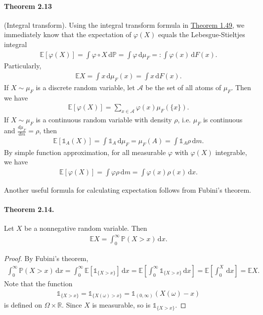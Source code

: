 \documentclass{article}
\numberwithin{equation}{section}
\newcommand{\E}{\mathbb{E}}
\renewcommand{\P}{\mathbb{P}}
\renewcommand{\d}{\mathrm{d}}
\theoremstyle{plain}
\theoremstyle{definition}
\begin{document}
\paragraph{Theorem 2.13\label{thm:2.13}} (Integral transform). Using the integral transform formula in \hyperref[thm:1.49]{Theorem 1.49}, we immediately know that the expectation of $\varphi(X)$ equals the Lebesgue-Stieltjes integral
\begin{align*}
	\E[\varphi(X)] = \int \varphi\circ X\,\d \P = \int \varphi\,\d \mu_F =: \int \varphi(x)\,\d F(x).
\end{align*}
Particularly,
\begin{align*}
	\E X = \int x\,\d \mu_F(x) = \int x\,\d F(x).
\end{align*}
If $X\sim\mu_F$ is a discrete random variable, let $\mathcal{A}$ be the set of all atoms of $\mu_F$. Then we have
\begin{align*}
	\E[\varphi(X)] = \sum_{x\in\mathcal{A}}\varphi(x)\mu_F(\{x\}).
\end{align*}
If $X\sim\mu_F$ is a continuous random variable with density $\rho$, i.e. $\mu_F$ is continuous and $\frac{d\mu_F}{dm}=\rho$, then
\begin{align*}
	\E[\mathds{1}_A(X)] = \int\mathds{1}_A\,\d \mu_F = \mu_F(A) = \int \mathds{1}_A\rho\,\d m.
\end{align*}
By simple function approximation, for all measurable $\varphi$ with $\varphi(X)$ integrable, we have
\begin{align*}
	\E[\varphi(X)] = \int \varphi\rho\,\d m = \int\varphi(x)\rho(x)\,\d x.
\end{align*}

Another useful formula for calculating expectation follows from Fubini's theorem.
\paragraph{Theorem 2.14.\label{thm:2.14}} Let $X$ be a nonnegative random variable. Then
\begin{align*}
	\E X = \int_0^\infty \P(X>x)\,\d x.
\end{align*}
\begin{proof}
By Fubini's theorem,
\begin{align*}
	\int_0^\infty \P(X>x)\,\d x = \int_0^\infty \E[\mathds{1}_{\{X>x\}}]\,\d x = \E\left[\int_0^\infty \mathds{1}_{\{X>x\}}\,\d x\right] = \E\left[\int_0^X\,\d x\right] = \E X.
\end{align*}
Note that the function
\begin{align*}
	\mathds{1}_{\{X>x\}} = \mathds{1}_{\{X(\omega)>x\}} = \mathds{1}_{(0,\infty)}(X(\omega)-x)
\end{align*}
is defined on $\Omega\times\mathbb{R}$. Since $X$ is measurable, so is $\mathds{1}_{\{X>x\}}$. 
\end{proof}
\end{document}
